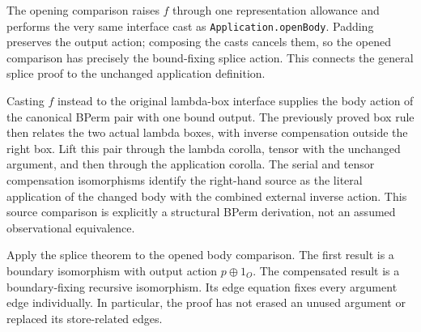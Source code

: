 The opening comparison raises $f$ through one representation allowance and
performs the very same interface cast as \texttt{Application.openBody}.
Padding preserves the output action; composing the casts cancels them, so
the opened comparison has precisely the bound-fixing splice action. This
connects the general splice proof to the unchanged application definition.


Casting $f$ instead to the original lambda-box interface supplies the body
action of the canonical BPerm pair with one bound output. The previously proved
box rule then relates the two actual lambda boxes, with inverse compensation
outside the right box. Lift this pair through the lambda corolla, tensor with
the unchanged argument, and then through the application corolla. The serial
and tensor compensation isomorphisms identify the right-hand source as the
literal application of the changed body with the combined external inverse
action. This source comparison is explicitly a structural BPerm derivation,
not an assumed observational equivalence.


Apply the splice theorem to the opened body comparison. The first result is a
boundary isomorphism with output action $p\oplus1_O$. The compensated result
is a boundary-fixing recursive isomorphism. Its edge equation fixes every
argument edge individually. In particular, the proof has not erased an unused
argument or replaced its store-related edges.


